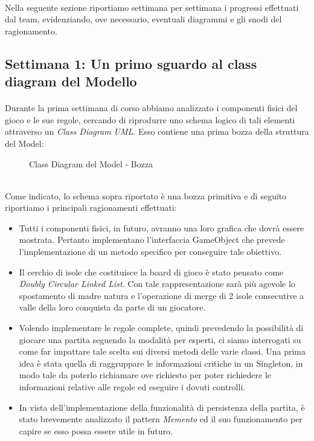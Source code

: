 \documentclass[a4paper, 12pt]{article}
\begin{document}
	\paragraph{}
	Nella seguente sezione riportiamo settimana per settimana i progressi effettuati dal team, evidenziando, ove necessario, eventuali diagrammi e gli snodi del ragionamento.
	\subsection{Settimana 1: Un primo sguardo al class diagram del Modello}
	\paragraph{}
	Durante la prima settimana di corso abbiamo analizzato i componenti fisici del gioco e le sue regole, cercando di riprodurre uno schema logico di tali elementi attraverso un \emph{Class Diagram UML}. Esso contiene una prima bozza della struttura del Model:\\
	\begin{figure}[h]
		\centering
		\def\svgwidth{\columnwidth}
		\resizebox{\linewidth}{!}{}
		\caption{Class Diagram del Model - Bozza}
	\end{figure}\\
	Come indicato, lo schema sopra riportato è una bozza primitiva e di seguito riportiamo i principali ragionamenti effettuati:\\
	\begin{itemize}
		\setlength{\parskip}{0pt}
		\setlength{\parsep}{0pt}
		
		\item Tutti i componenti fisici, in futuro, avranno una loro grafica che dovrà essere mostrata. Pertanto implementano l'interfaccia GameObject che prevede l'implementazione di un metodo specifico per conseguire tale obiettivo.
		\item Il cerchio di isole che costituisce la board di gioco è stato pensato come \emph{Doubly Circular Linked List}\cite{circularDoublyLinkedList}. Con tale rappresentazione sarà più agevole lo spostamento di madre natura e l'operazione di merge di 2 isole consecutive a valle della loro conquista da parte di un giocatore.
		\item Volendo implementare le regole complete, quindi prevedendo la possibilità di giocare una partita seguendo la modalità per esperti, ci siamo interrogati su come far impattare tale scelta sui diversi metodi delle varie classi. Una prima idea è stata quella di raggruppare le informazioni critiche in un Singleton, in modo tale da poterlo richiamare ove richiesto per poter richiedere le informazioni relative alle regole ed eseguire i dovuti controlli.
		\item In vista dell'implementazione della funzionalità di persistenza della partita, è stato brevemente analizzato il pattern \emph{Memento} ed il suo funzionamento per capire se esso possa essere utile in futuro.
	\end{itemize}
	
\end{document}
